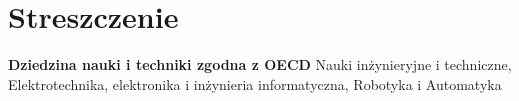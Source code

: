 \chapter*{Streszczenie}

\noindent\textbf{Dziedzina nauki i techniki zgodna z OECD} Nauki inżynieryjne i techniczne, Elektrotechnika, elektronika i inżynieria informatyczna, Robotyka i Automatyka

